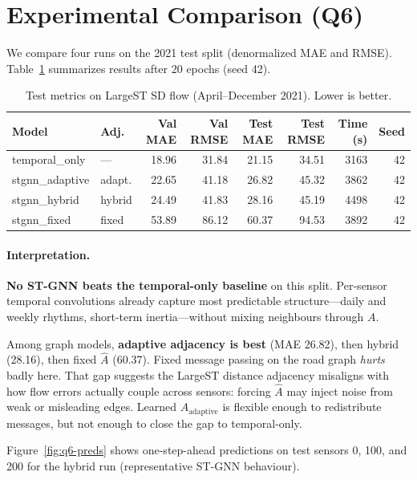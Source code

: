 \section{Experimental Comparison (Q6)}

We compare four runs on the 2021 test split (denormalized MAE and RMSE).
Table~\ref{tab:comparison} summarizes results after 20 epochs (seed 42).

\begin{table}[t]
  \centering
  \caption{Test metrics on LargeST SD flow (April--December 2021). Lower is better.}
  \label{tab:comparison}
  \begin{tabular}{llrrrrrr}
    \toprule
    Model & Adj. & Val MAE & Val RMSE & Test MAE & Test RMSE & Time (s) & Seed \\
    \midrule
    temporal\_only & --- & 18.96 & 31.84 & 21.15 & 34.51 & 3163 & 42 \\
    stgnn\_adaptive & adapt. & 22.65 & 41.18 & 26.82 & 45.32 & 3862 & 42 \\
    stgnn\_hybrid & hybrid & 24.49 & 41.83 & 28.16 & 45.19 & 4498 & 42 \\
    stgnn\_fixed & fixed & 53.89 & 86.12 & 60.37 & 94.53 & 3892 & 42 \\
    \bottomrule
  \end{tabular}
\end{table}

\paragraph{Interpretation.}
\textbf{No ST-GNN beats the temporal-only baseline} on this split.
Per-sensor temporal convolutions already capture most predictable structure---daily and weekly rhythms, short-term inertia---without mixing neighbours through $A$.

Among graph models, \textbf{adaptive adjacency is best} (MAE 26.82), then hybrid (28.16), then fixed $\hat{A}$ (60.37).
Fixed message passing on the road graph \emph{hurts} badly here.
That gap suggests the LargeST distance adjacency misaligns with how flow errors actually couple across sensors: forcing $\hat{A}$ may inject noise from weak or misleading edges.
Learned $A_{\mathrm{adaptive}}$ is flexible enough to redistribute messages, but not enough to close the gap to temporal-only.

Figure~\ref{fig:q6-preds} shows one-step-ahead predictions on test sensors 0, 100, and 200 for the hybrid run (representative ST-GNN behaviour).

